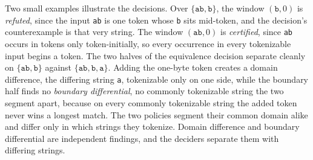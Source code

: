 \documentclass[11pt,a4paper]{article}
\theoremstyle{definition}
\theoremstyle{plain}
\newcommand{\code}[1]{\texttt{#1}}
\begin{document}
Two small examples illustrate the decisions. Over $\{\code{ab}, \code{b}\}$, the window $(\code{b}, 0)$ is
\emph{refuted}, since the input \code{ab} is one token whose \code{b} sits mid-token, and the decision's counterexample
is that very string. The window $(\code{ab}, 0)$ is \emph{certified}, since \code{ab} occurs in tokens only
token-initially, so every occurrence in every tokenizable input begins a token. The two halves of the equivalence
decision separate cleanly on $\{\code{ab}, \code{b}\}$ against $\{\code{ab}, \code{b}, \code{a}\}$. Adding the one-byte
token creates a domain difference, the differing string \code{a}, tokenizable only on one side, while the boundary half
finds no \emph{boundary differential}, no commonly tokenizable string the two segment apart, because on every commonly
tokenizable string the added token never wins a longest match. The two policies segment their common domain alike and
differ only in which strings they tokenize. Domain difference and boundary differential are independent findings, and
the deciders separate them with differing strings.
\end{document}

